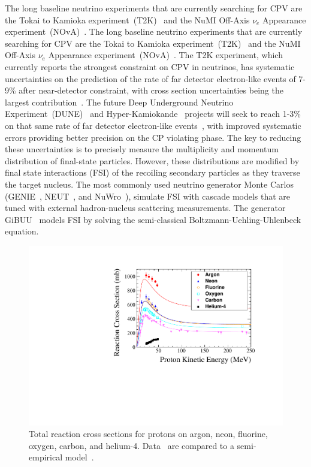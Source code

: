 The long baseline neutrino experiments that are currently searching for CPV are the Tokai to Kamioka experiment~(T2K)~\cite{Abe:2019vii} and the NuMI Off-Axis $\nu_{e}$ Appearance experiment~(NOvA)~\cite{Acero:2019ksn}.
The long baseline neutrino experiments that are currently searching for CPV are the Tokai to Kamioka experiment~(T2K)~\cite{Abe:2019vii} and the NuMI Off-Axis $\nu_{e}$ Appearance experiment~(NOvA)~\cite{Acero:2019ksn}.
The T2K experiment, which currently reports the strongest constraint on CPV in neutrinos, has systematic uncertainties on the prediction of the rate of far detector electron-like events of 7-9\% after near-detector constraint, with cross section uncertainties being the largest contribution~\cite{Abe:2019vii}.
The future Deep Underground Neutrino Experiment~(DUNE)~\cite{abi2020deep} and Hyper-Kamiokande~\cite{abe2011letter} projects will seek to reach 1-3\% on that same rate of far detector electron-like events~\cite{acciarri2016long}, with improved systematic errors providing better precision on the CP violating phase.
The key to reducing these uncertainties is to precisely measure the multiplicity and momentum distribution of final-state particles. 
However, these distributions are modified by final state interactions (FSI) of the recoiling secondary particles as they traverse the target nucleus. 
The most commonly used neutrino generator Monte Carlos (GENIE~\cite{Andreopoulos:2009rq}, NEUT~\cite{Hayato:2009zz}, and NuWro~\cite{GOLAN2012499}), simulate FSI with cascade models that are tuned with external hadron-nucleus scattering measurements. The generator GiBUU~\cite{lalakulich2013neutrino} models FSI by solving the semi-classical Boltzmann-Uehling-Uhlenbeck equation.

\begin{figure}%
    \centering
    \includegraphics[width=12cm]{files/Figures/DataProtonCrossSections.pdf}%
    \caption{Total reaction cross sections for protons on argon, neon, fluorine, oxygen, carbon, and helium-4. Data~\cite{Carlson:1996ofz} are compared to a semi-empirical model~\cite{wellisch1996total}.}
    \label{fig:DataProtonXSec}%
\end{figure}

